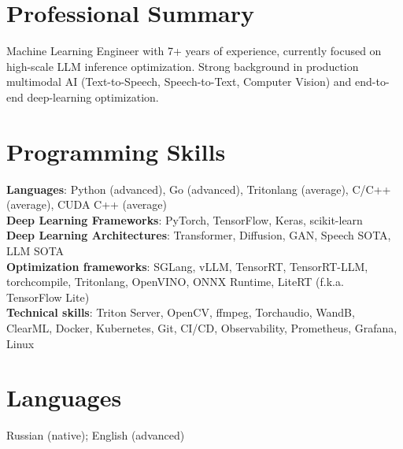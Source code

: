 \section{\sc Professional Summary}
Machine Learning Engineer with 7+ years of experience, currently focused on high-scale LLM inference optimization. Strong background in production multimodal AI (Text-to-Speech, Speech-to-Text, Computer Vision) and end-to-end deep-learning optimization.

\section{\sc Programming Skills}
\textbf{Languages}: Python (advanced), Go (advanced), Tritonlang (average), C/C++ (average), CUDA C++ (average) \\
\textbf{Deep Learning Frameworks}: PyTorch, TensorFlow, Keras, scikit-learn \\
\textbf{Deep Learning Architectures}: Transformer, Diffusion, GAN, Speech SOTA, LLM SOTA \\
\textbf{Optimization frameworks}: SGLang, vLLM, TensorRT, TensorRT-LLM, torchcompile, Tritonlang, OpenVINO, ONNX Runtime, LiteRT (f.k.a. TensorFlow Lite) \\
\textbf{Technical skills}: Triton Server, OpenCV, ffmpeg, Torchaudio, WandB, ClearML, Docker, Kubernetes, Git, CI/CD, Observability, Prometheus, Grafana, Linux

\section{\sc Languages}
{Russian (native); English (advanced)}

\endinput
